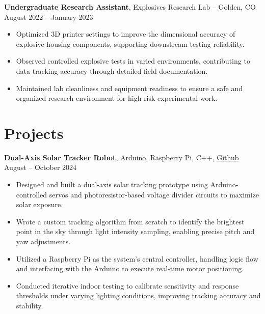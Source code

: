 \documentclass[11pt]{article}       %
\begin{document}
\textbf{Undergraduate Research Assistant}, Explosives Research Lab -- Golden, CO \hfill August 2022 -- January 2023
\vspace{-6pt}
\begin{itemize}
  \item Optimized 3D printer settings to improve the dimensional accuracy of explosive housing components, supporting downstream testing reliability.
  \item Observed controlled explosive tests in varied environments, contributing to data tracking accuracy through detailed field documentation.
  \item Maintained lab cleanliness and equipment readiness to ensure a safe and organized research environment for high-risk experimental work.
\end{itemize}

\vspace{-12pt}
\section*{Projects}
\vspace{3pt}

\textbf{Dual-Axis Solar Tracker Robot}, Arduino, Raspberry Pi, C++, \href{https://github.com/edwardasilva/SolarPanelProject}{Github} \hfill August -- October 2024
\vspace{-6pt}
\begin{itemize}
  \item Designed and built a dual-axis solar tracking prototype using Arduino-controlled servos and photoresistor-based voltage divider circuits to maximize solar exposure.
  \item Wrote a custom tracking algorithm from scratch to identify the brightest point in the sky through light intensity sampling, enabling precise pitch and yaw adjustments.
  \item Utilized a Raspberry Pi as the system's central controller, handling logic flow and interfacing with the Arduino to execute real-time motor positioning.
  \item Conducted iterative indoor testing to calibrate sensitivity and response thresholds under varying lighting conditions, improving tracking accuracy and stability.
\end{itemize}
\end{document}
